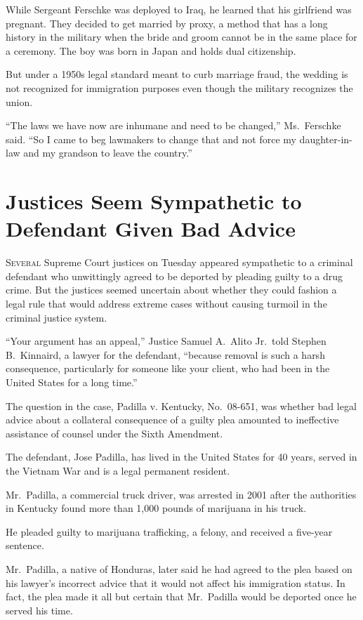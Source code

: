 ﻿\documentclass[12pt]{article}
\begin{document}
While Sergeant Ferschke was deployed to Iraq, he learned that his girlfriend was pregnant. They
decided to get married by proxy, a method that has a long history in the military when the bride and
groom cannot be in the same place for a ceremony. The boy was born in Japan and holds dual
citizenship.

But under a 1950s legal standard meant to curb marriage fraud, the wedding is not recognized for
immigration purposes even though the military recognizes the union.

``The laws we have now are inhumane and need to be changed,'' Ms.~Ferschke said. ``So I came to beg
lawmakers to change that and not force my daughter-in-law and my grandson to leave the country.''

\section{Justices Seem Sympathetic to Defendant Given Bad Advice}

\lettrine{S}{everal} Supreme Court justices on Tuesday appeared sympathetic
to a criminal defendant who unwittingly agreed to be deported by pleading guilty to a drug crime.
But the justices seemed uncertain about whether they could fashion a legal rule that would address
extreme cases without causing turmoil\cite{turmoil} in the criminal justice system.

``Your argument has an appeal,'' Justice Samuel A.~Alito Jr.~told Stephen B.~Kinnaird, a lawyer for
the defendant, ``because removal is such a harsh consequence, particularly for someone like your
client, who had been in the United States for a long time.''

The question in the case, Padilla v. Kentucky, No.~08-651, was whether bad legal advice about a
collateral consequence of a guilty plea amounted to ineffective assistance of counsel under the
Sixth Amendment.

The defendant, Jose Padilla, has lived in the United States for 40 years, served in the Vietnam War
and is a legal permanent resident.

Mr.~Padilla, a commercial truck driver, was arrested in 2001 after the authorities in Kentucky found
more than 1,000 pounds of marijuana in his truck.

He pleaded guilty to marijuana trafficking, a felony, and received a five-year sentence.

Mr.~Padilla, a native of Honduras, later said he had agreed to the plea based on his lawyer's
incorrect advice that it would not affect his immigration status. In fact, the plea made it all but
certain that Mr.~Padilla would be deported once he served his time.
\end{document}
